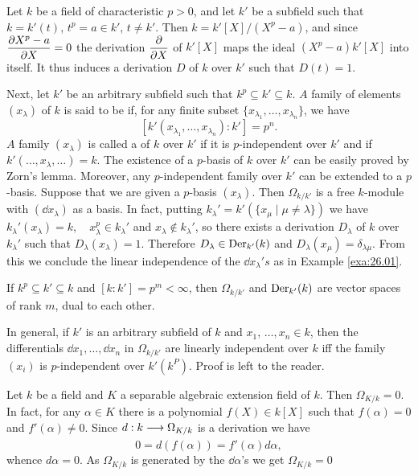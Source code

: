 \documentclass[../main]{subfiles}
\begin{document}
\begin{parexample}\label{exa:26.02}
Let $k$ be a field of characteristic $p>0$, and let $k'$ be a subfield such that $k=k'(t)$, $t^p=a \in k'$, $t \neq k'$. Then $k=k'[X] /(X^p-a)$, and since $\dfrac{\partial X^p-a}{\partial X}= 0$ the derivation $\dfrac{\partial }{\partial X}$ of $k'[X]$ maps the ideal $(X^p-a) k'[X]$ into itself. It thus induces a derivation $D$ of $k$ over $k'$ such that $D(t)=1$.

Next, let $k'$ be an arbitrary subfield such that $k^p \subseteq k'\subseteq k$. $A$ family of elements $(x_\lambda)$ of $k$ is said to be  if, for any finite subset $\{x_{\lambda_1}, \dots, x_{\lambda_n}\}$, we have \[[k'(x_{\lambda_1}, \dots, x_{\lambda_n}): k']=p^n.\] $A$ family $(x_\lambda)$ is called a  of $k$ over $k'$ if it is $p$-independent over $k'$ and if $k'(\dots, x_\lambda, \dots)=k$. The existence of a $p$-basis of $k$ over $k'$ can be easily proved by Zorn's lemma. Moreover, any $p$-independent family over $k'$ can be extended to a $p$-basis. Suppose that we are given a $p$-basis $(x_\lambda)$. Then $\Omega_{k / k'}$ is a free $k$-module with $(\dd x_\lambda)$ as a basis. In fact, putting $k_\lambda'=k'(\{x_{\mu} \mid \mu \neq \lambda\})$ we have $k_\lambda'(x_\lambda)=k,\quad x_\lambda^p \in k_\lambda'$ and $x_\lambda \notin k_\lambda'$, so there exists a derivation $D_\lambda$ of $k$ over $k_\lambda'$ such that $D_\lambda(x_\lambda)=1$. Therefore $D_\lambda \in \operatorname{Der}_{k'}(k)$ and $D_\lambda(x_{\mu})=\delta_{\lambda \mu}$. From this we conclude the linear independence of the $\dd x_\lambda' s$ as in Example \ref{exa:26.01}.

If $k^p \subseteq k' \subseteq k$ and $[k: k']=p^m<\infty$, then $\Omega_{k / k'}$ and $\operatorname{Der}_{k'}(k)$ are vector spaces of rank $m$, dual to each other.

In general, if $k'$ is an arbitrary subfield of $k$ and $x_1$, $\dots, x_n \in k$, then the differentials $\dd x_1, \dots, \dd x_n$ in $\Omega_{k / k'}$ are linearly independent over $k$ iff the family $(x_i)$ is $p$-independent over $k'(k^P)$. Proof is left to the reader.
\end{parexample}

\begin{parexample}
    Let $k$ be a field and $K$ a separable algebraic extension field of $k$. Then $\Omega_{K/k}=0$. In fact, for any $\alpha \in K$ there is a polynomial $f(X) \in k[X]$ such that $f(\alpha)=0$ and $f'(\alpha) \neq 0$. Since $d: k \varrightarrow{} \Omega_{K / k}$ is a derivation we have \[0=d(f(\alpha))=f'(\alpha) d \alpha,\] whence $d \alpha=0$. As $\Omega_{K / k}$ is generated by the $\dd \alpha$'s we get $\Omega_{K / k}=0$
\end{parexample} 
\end{document}
